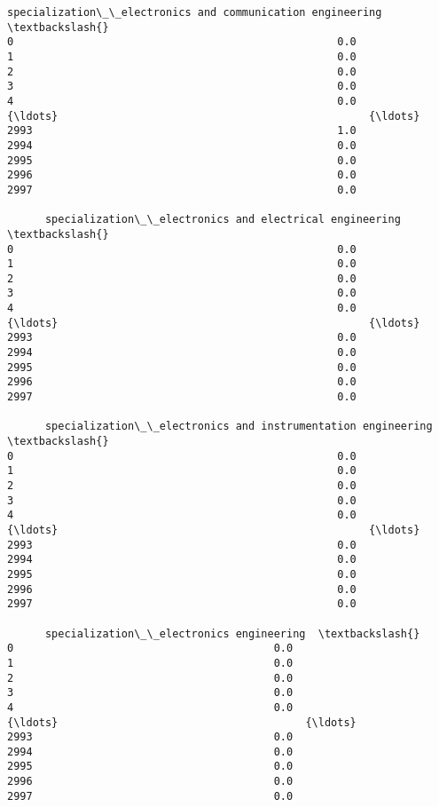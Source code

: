 \documentclass[11pt]{article}
\begin{document}
\begin{tcolorbox}[breakable, size=fbox, boxrule=.5pt, pad at break*=1mm, opacityfill=0]
\begin{Verbatim}[commandchars=\\\{\}]
      specialization\_\_electronics and communication engineering  \textbackslash{}
0                                                   0.0
1                                                   0.0
2                                                   0.0
3                                                   0.0
4                                                   0.0
{\ldots}                                                 {\ldots}
2993                                                1.0
2994                                                0.0
2995                                                0.0
2996                                                0.0
2997                                                0.0

      specialization\_\_electronics and electrical engineering  \textbackslash{}
0                                                   0.0
1                                                   0.0
2                                                   0.0
3                                                   0.0
4                                                   0.0
{\ldots}                                                 {\ldots}
2993                                                0.0
2994                                                0.0
2995                                                0.0
2996                                                0.0
2997                                                0.0

      specialization\_\_electronics and instrumentation engineering  \textbackslash{}
0                                                   0.0
1                                                   0.0
2                                                   0.0
3                                                   0.0
4                                                   0.0
{\ldots}                                                 {\ldots}
2993                                                0.0
2994                                                0.0
2995                                                0.0
2996                                                0.0
2997                                                0.0

      specialization\_\_electronics engineering  \textbackslash{}
0                                         0.0
1                                         0.0
2                                         0.0
3                                         0.0
4                                         0.0
{\ldots}                                       {\ldots}
2993                                      0.0
2994                                      0.0
2995                                      0.0
2996                                      0.0
2997                                      0.0


\end{Verbatim}
\end{tcolorbox}
\end{document}
